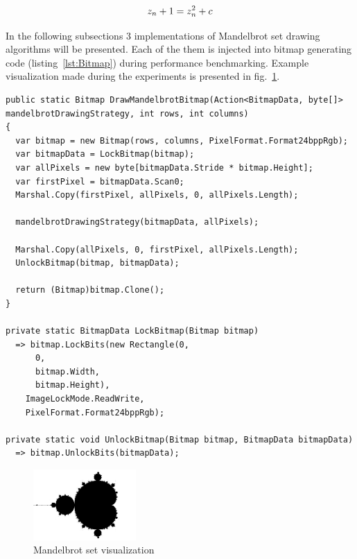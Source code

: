 \begin{equation}
\centering 
z_n + 1 = z_n^2 + c
\label{eq:Mandelbrot}
\end{equation}

In the following subsections 3 implementations of Mandelbrot set drawing algorithms will be presented. Each of the them is injected into bitmap generating code (listing~\ref{lst:Bitmap}) during performance benchmarking. Example visualization made during the experiments is presented in fig.~\ref{fig:MandelbrotVis}.

\begin{lstlisting}[style=sharpcstyle, caption={Mandelbrot bitmap generation}, label={lst:Bitmap},
numbers=none, xleftmargin=0pt,framexleftmargin=0pt,framexrightmargin=0pt,framexbottommargin=0pt]
public static Bitmap DrawMandelbrotBitmap(Action<BitmapData, byte[]> mandelbrotDrawingStrategy, int rows, int columns)
{
  var bitmap = new Bitmap(rows, columns, PixelFormat.Format24bppRgb);
  var bitmapData = LockBitmap(bitmap);
  var allPixels = new byte[bitmapData.Stride * bitmap.Height];
  var firstPixel = bitmapData.Scan0;
  Marshal.Copy(firstPixel, allPixels, 0, allPixels.Length);

  mandelbrotDrawingStrategy(bitmapData, allPixels);

  Marshal.Copy(allPixels, 0, firstPixel, allPixels.Length);
  UnlockBitmap(bitmap, bitmapData);

  return (Bitmap)bitmap.Clone();
}

private static BitmapData LockBitmap(Bitmap bitmap) 
  => bitmap.LockBits(new Rectangle(0,
      0,
      bitmap.Width,
      bitmap.Height),
    ImageLockMode.ReadWrite,
    PixelFormat.Format24bppRgb);

private static void UnlockBitmap(Bitmap bitmap, BitmapData bitmapData) 
  => bitmap.UnlockBits(bitmapData);

\end{lstlisting}

\begin{figure}[!ht]
	\centering
		\includegraphics[width = 0.35\textwidth]{figures04/MandelbrotVis.png}
	\caption{Mandelbrot set visualization}
	\label{fig:MandelbrotVis}
\end{figure}

